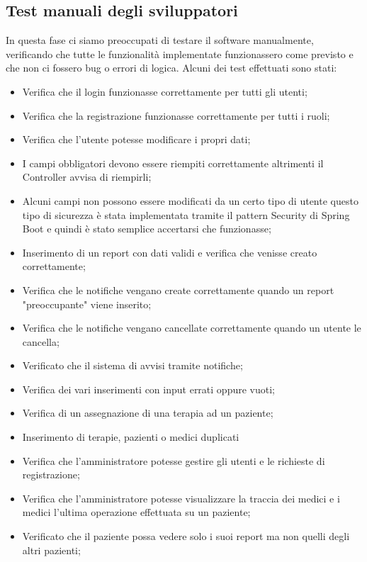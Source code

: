 \documentclass[a4paper]{article}
\begin{document}
\subsection{Test manuali degli sviluppatori}

In questa fase ci siamo preoccupati di testare il software manualmente,
verificando che tutte le funzionalità implementate funzionassero come previsto e che non ci fossero bug o errori di logica.
Alcuni dei test effettuati sono stati:
\begin{itemize}
  \item Verifica che il login funzionasse correttamente per tutti gli utenti;
  \item Verifica che la registrazione funzionasse correttamente per tutti i ruoli;
  \item Verifica che l'utente potesse modificare i propri dati;
  \item I campi obbligatori devono essere riempiti correttamente
  altrimenti il Controller avvisa di riempirli;
  \item Alcuni campi non possono essere modificati da un certo tipo di utente 
  questo tipo di sicurezza è stata implementata tramite il pattern Security di Spring Boot
  e quindi è stato semplice accertarsi che funzionasse;
  \item Inserimento di un report con dati validi e verifica che venisse creato correttamente;
  \item Verifica che le notifiche vengano create correttamente quando un report 
  "preoccupante" viene inserito;
  \item Verifica che le notifiche vengano cancellate 
  correttamente quando un utente le cancella;
  \item Verificato che il sistema di avvisi tramite notifiche;
  \item Verifica dei vari inserimenti con input errati oppure vuoti;
  \item Verifica di un assegnazione di una terapia ad un paziente;
  \item Inserimento di terapie, pazienti o medici duplicati
  \item Verifica che l'amministratore potesse gestire gli utenti e le richieste di registrazione;
  \item Verifica che l'amministratore potesse visualizzare la traccia dei medici e i medici l'ultima 
  operazione effettuata su un paziente;
  \item Verificato che il paziente possa vedere solo i suoi report ma non quelli degli altri pazienti;
\end{itemize}
\end{document}
